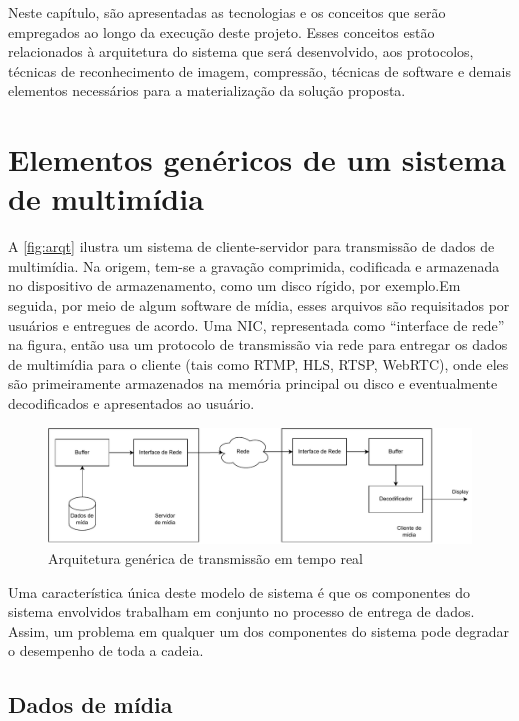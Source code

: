 \documentclass[12pt, %
openright, 
oneside, %
a4paper,    %
brazil]{facom-ufu-abntex2}
\begin{document}
Neste capítulo, são apresentadas as tecnologias e os conceitos que serão
empregados ao longo da execução deste projeto. Esses conceitos estão
relacionados à arquitetura do sistema que será desenvolvido, aos protocolos,
técnicas de reconhecimento de imagem, compressão, técnicas de software e demais
elementos necessários para a materialização da solução proposta.

\section{Elementos genéricos de um sistema de multimídia}

A \autoref{fig:arqt} ilustra um sistema de cliente-servidor para transmissão de
dados de multimídia. Na origem, tem-se a gravação comprimida, codificada e
armazenada no dispositivo de armazenamento, como um disco rígido, por
exemplo.Em seguida, por meio de algum software de mídia, esses arquivos são
requisitados por usuários e entregues de acordo. Uma NIC, representada como
``interface de rede'' na figura, então usa um protocolo de transmissão via rede
para entregar os dados de multimídia para o cliente (tais como RTMP, HLS, RTSP,
WebRTC), onde eles são primeiramente armazenados na memória principal ou disco
e eventualmente decodificados e apresentados ao usuário.

\begin{figure}[!ht]
	\centering
	\includegraphics[width=1\linewidth]{media_fundamentals.pdf}
	\caption[Representação de um arquitetura de tempo real
		genérica]{Arquitetura genérica de transmissão em tempo real}
	\label{fig:arqt}
\end{figure}

Uma característica única deste modelo de sistema é que os componentes do
sistema envolvidos trabalham em conjunto no processo de entrega de dados.
Assim, um problema em qualquer um dos componentes do sistema pode degradar o
desempenho de toda a cadeia.

\subsection{Dados de mídia}
\end{document}
